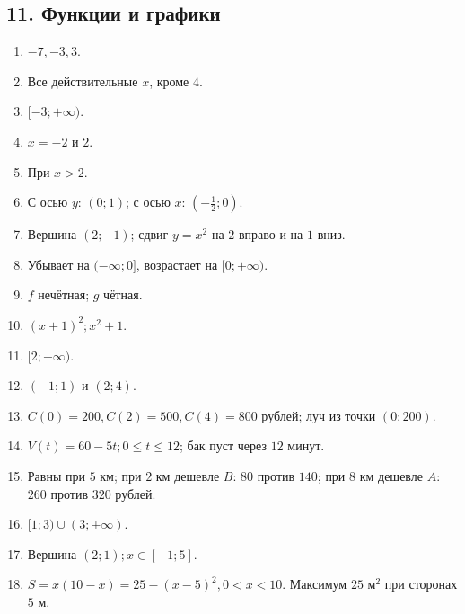 \documentclass[12pt,a4paper]{article}
\theoremstyle{definition}
\theoremstyle{plain}
\theoremstyle{remark}
\newcommand{\starmark}{\ensuremath{{}^{\ast}}}
\begin{document}
\subsection*{11. Функции и графики}
\begin{enumerate}[label=11.\arabic*.,leftmargin=2.8em,itemsep=5pt]
\item \(- 7,\allowbreak - 3,\allowbreak 3\).
\item Все действительные \(x\), кроме \(4\).
\item \([- 3;\allowbreak + \infty )\).
\item \(x = - 2\) и \(2\).
\item При \(x > 2\).
\item С осью \(y\): \((0;\allowbreak 1)\); с осью \(x\): \((-\frac{1}{2};\allowbreak 0)\).
\item Вершина \((2;\allowbreak - 1)\); сдвиг \(y = x^{2}\) на \(2\) вправо и на \(1\) вниз.
\item Убывает на \((- \infty ;\allowbreak 0]\), возрастает на \([0;\allowbreak + \infty )\).
\item \(f\) нечётная; \(g\) чётная.
\item \((x + 1)^{2};\allowbreak x^{2} + 1\).
\item \([2;\allowbreak + \infty )\).
\item \((- 1;\allowbreak 1)\) и \((2;\allowbreak 4)\).
\item \(C (0) = 200,\allowbreak C (2) = 500,\allowbreak C (4) = 800\) рублей; луч из точки \((0;\allowbreak 200)\).
\item \(V (t) = 60 - 5 t;\allowbreak 0 \le  t \le  12\); бак пуст через \(12\) минут.
\item Равны при \(5\) км; при \(2\) км дешевле \(B\): \(80\) против \(140\); при \(8\) км дешевле \(A\): \(260\) против \(320\) рублей.
\item[\textbf{11.16.}\starmark] \([1;\allowbreak 3) \cup  (3;\allowbreak + \infty )\).
\item[\textbf{11.17.}\starmark] Вершина \((2;\allowbreak 1);\allowbreak x \in  [- 1;\allowbreak 5]\).
\item[\textbf{11.18.}\starmark] \(S = x (10 - x) = 25 - (x - 5)^{2},\allowbreak 0 < x < 10\). Максимум \(25\) м\(^{2}\) при сторонах \(5\) м.
\end{enumerate}
\end{document}
